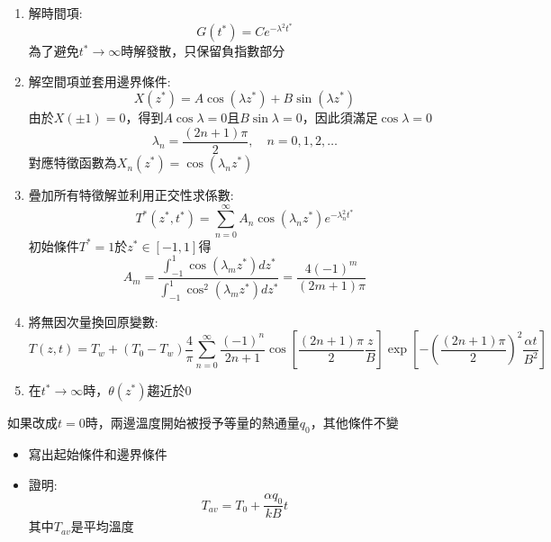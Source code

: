 \documentclass[../main.tex]{subfiles}
\begin{document}
\begin{itemize}
\begin{enumerate}
\begin{align}
    \end{align}
    \item 解時間項:
    \begin{equation}
      G(t^\ast) = C e^{-\lambda^2 t^\ast}
    \end{equation}
    為了避免$t^\ast \to \infty$時解發散，只保留負指數部分
    \item 解空間項並套用邊界條件:
    \begin{equation}
      X(z^\ast) = A \cos(\lambda z^\ast) + B \sin(\lambda z^\ast)
    \end{equation}
    由於$X(\pm 1)=0$，得到$A \cos \lambda = 0$且$B \sin \lambda = 0$，因此須滿足$\cos \lambda = 0$
    \begin{equation}
      \lambda_n = \frac{(2n+1)\pi}{2}, \quad n = 0,1,2,\ldots
    \end{equation}
    對應特徵函數為$X_n(z^\ast) = \cos(\lambda_n z^\ast)$
    \item 疊加所有特徵解並利用正交性求係數:
    \begin{equation}
      T^\ast(z^\ast,t^\ast) = \sum_{n=0}^{\infty} A_n \cos(\lambda_n z^\ast) e^{-\lambda_n^2 t^\ast}
    \end{equation}
    初始條件$T^\ast=1$於$z^\ast\in[-1,1]$得
    \begin{equation}
      A_m = \frac{\int_{-1}^{1} \cos(\lambda_m z^\ast) dz^\ast}{\int_{-1}^{1} \cos^2(\lambda_m z^\ast) dz^\ast} = 
      \frac{4(-1)^m}{(2m+1)\pi}
    \end{equation}
    \item 將無因次量換回原變數:
    \begin{equation}
      T(z,t) = T_w + (T_0 - T_w) \frac{4}{\pi} \sum_{n=0}^{\infty} 
      \frac{(-1)^n}{2n+1} \cos\left[\frac{(2n+1)\pi}{2} \frac{z}{B}\right] 
      \exp\left[-\left(\frac{(2n+1)\pi}{2}\right)^2 \frac{\alpha t}{B^2}\right]
    \end{equation}
    \item 在$t^\ast\to\infty$時，$\theta(z^\ast)$趨近於0
  \end{enumerate}
  如果改成$t=0$時，兩邊溫度開始被授予等量的熱通量$q_0$，其他條件不變
  \begin{itemize}
    \item 寫出起始條件和邊界條件
    \item 證明:
    \begin{equation}
      T_{av} = T_0 + \frac{\alpha q_0}{kB} t
    \end{equation}
    其中$T_{av}$是平均溫度
    \begin{equation}

\end{equation}
\end{itemize}
\end{itemize}
\end{document}
